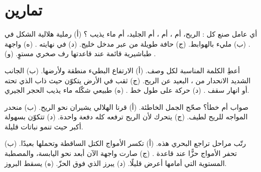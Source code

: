 \section{تمارين}

\begin{exercise}[$\star$]\label{exo:g9:landforms:1}
أي عامل صنع كل : الريح، أم ، أم ، أم الجليد، أم ماء
يذيب ؟ (أ)  رملية هلالية الشكل في . (ب)  مليء بالهوابط.
(ج) حافة طويلة من  عبر مدخل خليج. (د)  في
نهايته . (ه) واجهة طباشيرية قائمة عند قاعدتها رف صخري مستوٍ.
(و) .
\end{exercise}

\begin{exercise}[$\star$]\label{exo:g9:landforms:2}
أعطِ الكلمة المناسبة لكل وصف. (أ) الارتفاع البطيء  منطقة ولأرضها.
(ب) الجانب الشديد الانحدار من ، البعيد عن الريح. (ج) ثقب في
الأرض يتكوّن حيث ذاب  الذي تحته أو انهار سقف . (د) حركة 
 على طول خط . (ه)  طبيعي شكّله ماء يذيب الحجر
الجيري.
\end{exercise}

\begin{exercise}[$\star$]\label{exo:g9:landforms:3}
صواب أم خطأ؟ صحّح الجمل الخاطئة. (أ) قرنا  الهلالي يشيران نحو
الريح. (ب) منحدر  المواجه للريح لطيف. (ج) يتحرك  لأن الريح
ترفعه كله دفعة واحدة. (د) تتكوّن  بسهولة أكبر حيث تنمو نباتات
قليلة.
\end{exercise}

\begin{exercise}[$\star$]\label{exo:g9:landforms:4}
رتّب مراحل تراجع  البحري هذه. (أ) تكسر الأمواج الكتل الساقطة
وتحملها بعيدًا. (ب) تحفر الأمواج حزًّا عند قاعدة . (ج) صارت واجهة
 الآن أبعد نحو اليابسة، والمصطبة المستوية التي أمامها أعرض قليلًا.
(د) يبرز  الذي فوق الحزّ. (ه) يسقط
البروز.
\end{exercise}

